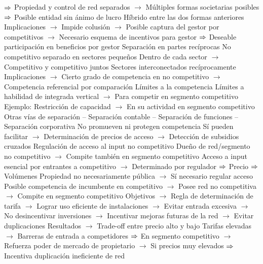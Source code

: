\documentclass{nuevotema}
\begin{document}
\begin{esquemal}
				\4[] $\Rightarrow$ Propiedad y control de red separados
				\4[] $\to$ Múltiples formas societarias posibles
				\4[] $\Rightarrow$ Posible entidad sin ánimo de lucro
				\4[] Híbrido entre las dos formas anteriores
				\4[] Implicaciones
				\4[] $\to$ Impide colusión
				\4[] $\to$ Posible captura del gestor por competitivos
				\4[] $\to$ Necesario esquema de incentivos para gestor
				\4[] $\Rightarrow$ Deseable participación en beneficios por gestor
				\4 Separación en partes recíprocas
				\4[] No competitivo separado en sectores pequeños
				\4[] Dentro de cada sector
				\4[] $\to$ Competitivo y competitivo juntos
				\4[] Sectores interconectados recíprocamente
				\4[] Implicaciones
				\4[] $\to$ Cierto grado de competencia en no competitivo
				\4[] $\to$ Competencia referencial por comparación
				\4 Límites a la competencia
				\4[] Límites a habilidad de integrada vertical
				\4[] $\to$ Para competir en segmento competitivo
				\4 Ejemplo:
				\4[] Restricción de capacidad
				\4[] $\to$ En su actividad en segmento competitivo
				\4 Otras vías de separación
				\4[] -- Separación contable
				\4[] -- Separación de funciones
				\4[] -- Separación corporativa
				\4[] No promueven ni protegen competencia
				\4[] Sí pueden facilitar
				\4[] $\to$ Determinación de precios de acceso
				\4[] $\to$ Detección de subsidios cruzados
			\3 Regulación de acceso al input no competitivo
				\4 Dueño de red/segmento no competitivo
				\4[] $\to$ Compite también en segmento competitivo
				\4 Acceso a input esencial por entrantes a competitivo
				\4[] $\to$ Determinado por regulador
				\4[] $\Rightarrow$ Precio
				\4[] $\Rightarrow$ Volúmenes
				\4 Propiedad no necesariamente pública
				\4[] $\to$ Sí necesario regular acceso
				\4[] Posible competencia de incumbente en competitivo
				\4[] $\to$ Posee red no competitiva
				\4[] $\to$ Compite en segmento competitivo
				\4[] Objetivos
				\4[] $\to$ Regla de determinación de tarifa
				\4[] $\to$ Lograr uso eficiente de instalaciones
				\4[] $\to$ Evitar entrada excesiva
				\4[] $\to$ No desincentivar inversiones
				\4[] $\to$ Incentivar mejoras futuras de la red
				\4[] $\to$ Evitar duplicaciones
				\4[] Resultados
				\4[] $\to$ Trade-off entre precio alto y bajo
				\4[] Tarifas elevadas
				\4[] $\to$ Barreras de entrada a competidores
				\4[] $\Rightarrow$ En segmento competitivo
				\4[] $\to$ Refuerza poder de mercado de propietario
				\4[] $\to$ Si precios muy elevados
				\4[] $\Rightarrow$ Incentiva duplicación ineficiente de red

\end{esquemal}
\end{document}
